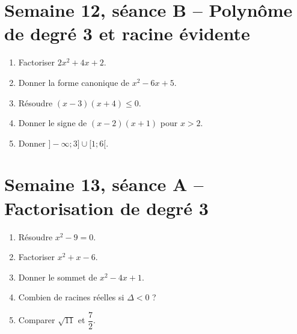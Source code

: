 \section{Semaine 12, séance B -- Polynôme de degré 3 et racine évidente}
\begin{enumerate}
  \item Factoriser $2x^2+4x+2$.
  \item Donner la forme canonique de $x^2-6x+5$.
  \item Résoudre $(x-3)(x+4)\leq0$.
  \item Donner le signe de $(x-2)(x+1)$ pour $x>2$.
  \item Donner $]-\infty;3]\cup[1;6[$.
\end{enumerate}
\TeacherOnly{%
\begin{tcolorbox}[colback=VE!3,colframe=VE!35,boxrule=.4pt,arc=1mm]
\small\textit{Réponses.}\quad \textbf{1.} $2(x+1)^2$. \quad \textbf{2.} $(x-3)^2-4$. \quad \textbf{3.} $x\in[-4;3]$. \quad \textbf{4.} Positif. \quad \textbf{5.} $]-\infty;6[$.
\end{tcolorbox}}

\section{Semaine 13, séance A -- Factorisation de degré 3}
\begin{enumerate}
  \item Résoudre $x^2-9=0$.
  \item Factoriser $x^2+x-6$.
  \item Donner le sommet de $x^2-4x+1$.
  \item Combien de racines réelles si $\Delta<0$ ?
  \item Comparer $\sqrt{11}$ et $\dfrac72$.
\end{enumerate}

